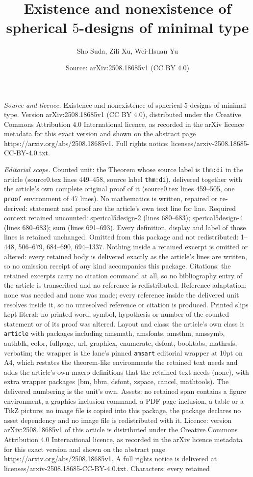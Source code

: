 \documentclass[10pt,a4paper]{amsart}
\title[Existence and nonexistence of spherical $5$-designs of minim]{Existence and nonexistence of spherical $5$-designs of minimal type}
\author{Sho Suda, Zili Xu, Wei-Hsuan Yu}
\date{Source: arXiv:2508.18685v1 (CC BY 4.0)}
\begin{document}
\maketitle

\noindent\emph{Source and licence.} Existence and nonexistence of spherical $5$-designs of minimal type. Version arXiv:2508.18685v1 (CC BY 4.0), distributed under the Creative Commons Attribution 4.0 International licence, as recorded in the arXiv licence metadata for this exact version and shown on the abstract page https://arxiv.org/abs/2508.18685v1. Full rights notice: licenses/arxiv-2508.18685-CC-BY-4.0.txt.\par\smallskip

\noindent\textit{Editorial scope.} Counted unit: the Theorem whose source label is \texttt{thm:di} in the article (source0.tex lines 449--458, source label \texttt{thm:di}), delivered together with the article's own complete original proof of it (source0.tex lines 459--505, one \texttt{proof} environment of 47 lines). No mathematics is written, repaired or re-derived: statement and proof are the article's own text line for line. Required context retained uncounted: sperical5design-2 (lines 680--683); sperical5design-4 (lines 680--683); sum (lines 691--693). Every definition, display and label of those lines is retained unchanged. Omitted from this package and not redistributed: 1--448, 506--679, 684--690, 694--1337. Nothing inside a retained excerpt is omitted or altered: every retained body is delivered exactly as the article's lines are written, so no omission receipt of any kind accompanies this package. Citations: the retained excerpts carry no citation command at all, so no bibliography entry of the article is transcribed and no reference is redistributed. Reference adaptation: none was needed and none was made; every reference inside the delivered unit resolves inside it, so no unresolved reference or citation is produced. Printed slips kept literal: no printed word, symbol, hypothesis or number of the counted statement or of its proof was altered. Layout and class: the article's own class is \texttt{article} with packages including amsmath, amsfonts, amsthm, amssymb, authblk, color, fullpage, url, graphicx, enumerate, dsfont, booktabs, mathrsfs, verbatim; the wrapper is the lane's pinned \texttt{amsart} editorial wrapper at 10pt on A4, which restates the theorem-like environments the retained text needs and adds the article's own macro definitions that the retained text needs (none), with extra wrapper packages (bm, bbm, dsfont, xspace, cancel, mathtools). The delivered numbering is the unit's own. Assets: no retained span contains a figure environment, a graphics-inclusion command, a PDF-page inclusion, a table or a TikZ picture; no image file is copied into this package, the package declares no asset dependency and no image file is redistributed with it. Licence: version arXiv:2508.18685v1 of this article is distributed under the Creative Commons Attribution 4.0 International licence, as recorded in the arXiv licence metadata for this exact version and shown on the abstract page https://arxiv.org/abs/2508.18685v1. A full rights notice is delivered at licenses/arxiv-2508.18685-CC-BY-4.0.txt. Characters: every retained 
\end{document}
